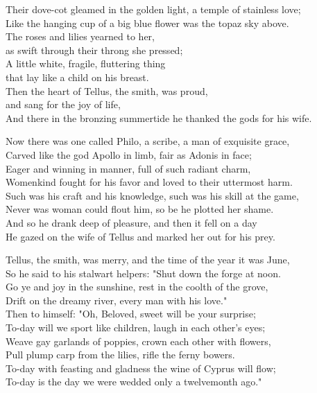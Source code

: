 \begin{poemblock}
Their dove-cot gleamed in the golden light, a temple of stainless love;\\
Like the hanging cup of a big blue flower was the topaz sky above.\\
The roses and lilies yearned to her,\\
\idt  as swift through their throng she pressed;\\
A little white, fragile, fluttering thing\\
\idt  that lay like a child on his breast.\\
Then the heart of Tellus, the smith, was proud,\\
\idt  and sang for the joy of life,\\
And there in the bronzing summertide he thanked the gods for his wife.

Now there was one called Philo, a scribe, a man of exquisite grace,\\
Carved like the god Apollo in limb, fair as Adonis in face;\\
Eager and winning in manner, full of such radiant charm,\\
Womenkind fought for his favor and loved to their uttermost harm.\\
Such was his craft and his knowledge, such was his skill at the game,\\
Never was woman could flout him, so be he plotted her shame.\\
And so he drank deep of pleasure, and then it fell on a day\\
He gazed on the wife of Tellus and marked her out for his prey.

Tellus, the smith, was merry, and the time of the year it was June,\\
So he said to his stalwart helpers:  "Shut down the forge at noon.\\
Go ye and joy in the sunshine, rest in the coolth of the grove,\\
Drift on the dreamy river, every man with his love."\\
Then to himself:  "Oh, Beloved, sweet will be your surprise;\\
To-day will we sport like children, laugh in each other's eyes;\\
Weave gay garlands of poppies, crown each other with flowers,\\
Pull plump carp from the lilies, rifle the ferny bowers.\\
To-day with feasting and gladness the wine of Cyprus will flow;\\
To-day is the day we were wedded only a twelvemonth ago."


\end{poemblock}
